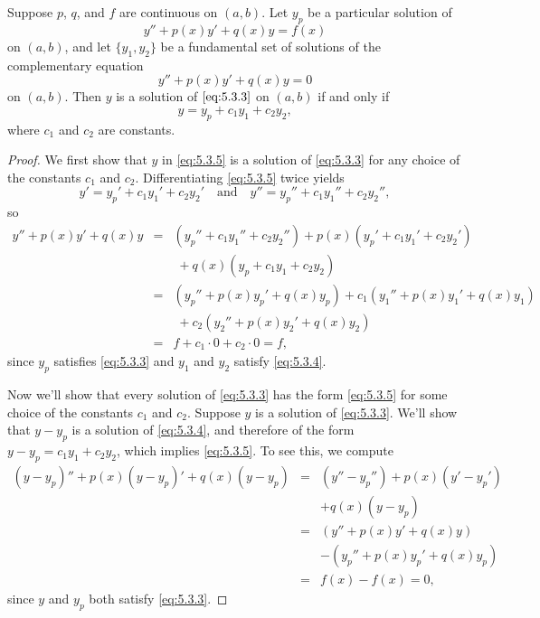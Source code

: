 \documentclass{ximera}
\begin{document}
\begin{theorem}\label{thmtype:5.3.2}
Suppose $p$, $q$, and $f$ are continuous on $(a,b)$. Let $y_p$
be a particular solution of
\begin{equation} \label{eq:5.3.3}
y''+p(x)y'+q(x)y=f(x)
\end{equation}
on $(a,b)$, and let  $\{y_1,y_2\}$ be a fundamental set of solutions
of the complementary equation
\begin{equation} \label{eq:5.3.4}
y''+p(x)y'+q(x)y=0
\end{equation}
on $(a,b)$.
Then $y$ is a solution of  $\eqref{eq:5.3.3}$ on $(a,b)$ if and  only if
\begin{equation} \label{eq:5.3.5}
y=y_p+c_1y_1+c_2y_2,
\end{equation}
where $c_1$ and $c_2$  are constants.
\end{theorem}
 
\begin{proof} We first show that $y$ in \eqref{eq:5.3.5} is a solution of
\eqref{eq:5.3.3} for any choice of the constants $c_1$ and $c_2$.
Differentiating \eqref{eq:5.3.5} twice yields
$$
y'=y_p'+c_1y_1'+c_2y_2'\quad\mbox{and}\quad
y''=y_p''+ c_1y_1''+c_2y_2'',
$$
so
\begin{eqnarray*}
y''+p(x)y'+q(x)y&=&(y_p''+c_1y_1''+c_2y_2'')
+p(x)(y_p'+c_1y_1'+c_2y_2')\\&&\; +q(x)(y_p+c_1y_1+c_2y_2)\\
&=&(y_p''+p(x)y_p'+q(x)y_p)+c_1(y_1''+p(x)y_1'+q(x)y_1)\\
&&\; +c_2(y_2''+p(x)y_2'+q(x)y_2)\\
&=& f+c_1\cdot0+c_2\cdot 0=f,
\end{eqnarray*}
since $y_p$ satisfies \eqref{eq:5.3.3} and $y_1$ and $y_2$ satisfy
\eqref{eq:5.3.4}.
 
Now we'll show that every solution of \eqref{eq:5.3.3} has the form
\eqref{eq:5.3.5} for some choice of the constants $c_1$ and  $c_2$.
Suppose $y$ is a solution of \eqref{eq:5.3.3}. We'll show that
$y-y_p$ is a solution of \eqref{eq:5.3.4}, and therefore of the form
$y-y_p=c_1y_1+c_2y_2$, which implies \eqref{eq:5.3.5}. To see this, we
compute
\begin{eqnarray*}
(y-y_p)''+p(x)(y-y_p)'+q(x)(y-y_p)&=&(y''-y_p'')+p(x)(y'-y_p')\\ &&
+q(x)(y-y_p)\\
&=&(y''+p(x)y'+q(x)y)\\ && -(y_p''+p(x)y_p'+q(x)y_p)\\
&=&f(x)-f(x)=0,
\end{eqnarray*}
since $y$ and $y_p$ both satisfy \eqref{eq:5.3.3}.
\end{proof}
 
\end{document}
